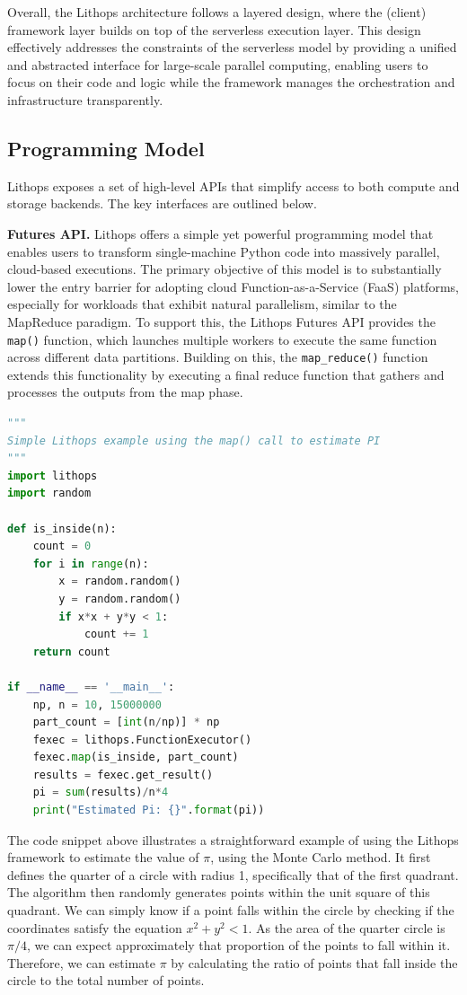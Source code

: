 Overall, the Lithops architecture follows a layered design, where the (client) framework layer builds on top of the serverless execution layer. This design effectively addresses the constraints of the serverless model by providing a unified and abstracted interface for large-scale parallel computing, enabling users to focus on their code and logic while the framework manages the orchestration and infrastructure transparently.


\subsection{Programming Model}
Lithops exposes a set of high-level APIs that simplify access to both compute and storage backends. The key interfaces are outlined below.


\noindent
\vspace{0.5em} \textbf{Futures API.  } Lithops offers a simple yet powerful programming model that enables users to transform single-machine Python code into massively parallel, cloud-based executions. The primary objective of this model is to substantially lower the entry barrier for adopting cloud Function-as-a-Service (FaaS) platforms, especially for workloads that exhibit natural parallelism, similar to the MapReduce paradigm. To support this, the Lithops Futures API provides the \texttt{map()} function, which launches multiple workers to execute the same function across different data partitions. Building on this, the \texttt{map_reduce()} function extends this functionality by executing a final reduce function that gathers and processes the outputs from the map phase.

\begin{lstlisting}[language=Python, basicstyle=\ttfamily\small, commentstyle=\color{gray}]
"""
Simple Lithops example using the map() call to estimate PI
"""
import lithops
import random

def is_inside(n):
    count = 0
    for i in range(n):
        x = random.random()
        y = random.random()
        if x*x + y*y < 1:
            count += 1
    return count

if __name__ == '__main__':
    np, n = 10, 15000000
    part_count = [int(n/np)] * np
    fexec = lithops.FunctionExecutor()
    fexec.map(is_inside, part_count)
    results = fexec.get_result()
    pi = sum(results)/n*4
    print("Estimated Pi: {}".format(pi))
\end{lstlisting}


The code snippet above illustrates a straightforward example of using the Lithops framework to estimate the value of $\pi$, using the Monte Carlo method. It first defines the quarter of a circle with radius 1, specifically that of the first quadrant. The algorithm then randomly generates points within the unit square of this quadrant. We can simply know if a point falls within the circle by checking if the coordinates satisfy the equation $x^2 + y^2 < 1$. As the area of the quarter circle is $\pi/4$, we can expect approximately that proportion of the points to fall within it. Therefore, we can estimate $\pi$ by calculating the ratio of points that fall inside the circle to the total number of points.

